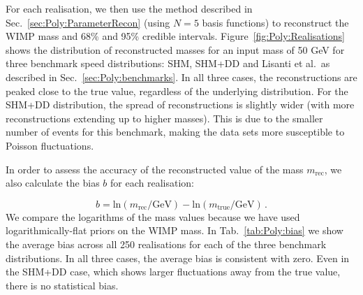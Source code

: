 For each realisation, we then use the method described in Sec.~\ref{sec:Poly:ParameterRecon} (using $N = 5$ basis functions) to reconstruct the WIMP mass and 68\% and 95\% credible intervals. Figure~\ref{fig:Poly:Realisations} shows the distribution of reconstructed masses for an input mass of 50 GeV for three benchmark speed distributions: SHM, SHM+DD and Lisanti et al.\, as described in Sec.~\ref{sec:Poly:benchmarks}. In all three cases, the reconstructions are peaked close to the true value, regardless of the underlying distribution. For the SHM+DD distribution, the spread of reconstructions is slightly wider (with more reconstructions extending up to higher masses). This is due to the smaller number of events for this benchmark, making the data sets more susceptible to Poisson fluctuations.

In order to assess the accuracy of the reconstructed value of the mass $m_\textrm{rec}$, we also calculate the bias $b$ for each realisation:

\begin{equation}
\label{eq:Poly:bias}
b = \textrm{ln}(m_\textrm{rec} / \textrm{GeV}) - \textrm{ln}(m_\textrm{true} / \textrm{GeV})\,.
\end{equation}
We compare the logarithms of the mass values because we have used logarithmically-flat priors on the WIMP mass. In Tab.~\ref{tab:Poly:bias} we show the average bias across all 250 realisations for each of the three benchmark distributions. In all three cases, the average bias is consistent with zero. Even in the SHM+DD case, which shows larger fluctuations away from the true value, there is no statistical bias.


